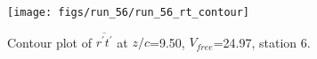 \begin{figure}[H]
\centering
\texttt{[image: figs/run\_56/run\_56\_rt\_contour]}
\caption{Contour plot of $\overline{r^\prime t^\prime}$ at $z/c$=9.50, $V_{free}$=24.97, station 6.}
\label{fig:run_56_rt_contour}
\end{figure}


